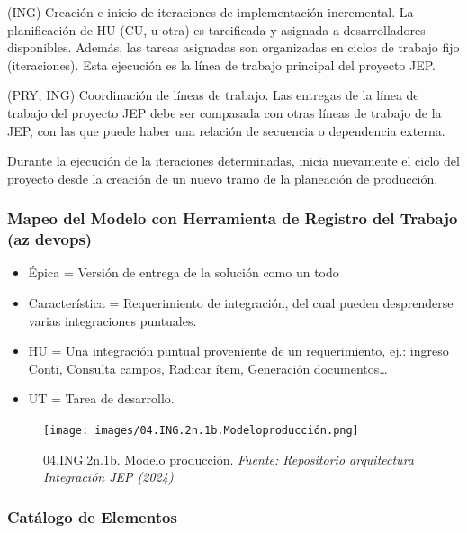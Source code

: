 \documentclass[
  paper=a4,
  ,captions=tableheading
]{scrartcl}
\providecommand{\tightlist}{%
  \setlength{\itemsep}{0pt}\setlength{\parskip}{0pt}}
\begin{document}
(ING) Creación e inicio de iteraciones de implementación incremental. La
planificación de HU (CU, u otra) es tareificada y asignada a
desarrolladores disponibles. Además, las tareas asignadas son
organizadas en ciclos de trabajo fijo (iteraciones). Esta ejecución es
la línea de trabajo principal del proyecto JEP.

(PRY, ING) Coordinación de líneas de trabajo. Las entregas de la línea
de trabajo del proyecto JEP debe ser compasada con otras líneas de
trabajo de la JEP, con las que puede haber una relación de secuencia o
dependencia externa.

Durante la ejecución de la iteraciones determinadas, inicia nuevamente
el ciclo del proyecto desde la creación de un nuevo tramo de la
planeación de producción.

\subsubsection{Mapeo del Modelo con Herramienta de Registro del Trabajo
(az
devops)}\label{sec:mapeo-del-modelo-con-herramienta-de-registro-del-trabajo-az-devops}

\begin{itemize}
\tightlist
\item
  Épica = Versión de entrega de la solución como un todo
\item
  Característica = Requerimiento de integración, del cual pueden
  desprenderse varias integraciones puntuales.
\item
  HU = Una integración puntual proveniente de un requerimiento, ej.:
  ingreso Conti, Consulta campos, Radicar ítem, Generación
  documentos\ldots{}
\item
  UT = Tarea de desarrollo.
\end{itemize}

\begin{figure}
\centering
\texttt{[image: images/04.ING.2n.1b.Modeloproducción.png]}
\caption{04.ING.2n.1b. Modelo producción. \emph{Fuente: Repositorio
arquitectura Integración JEP
(2024)}}\label{fig:id-9938d5859d53450fa5c5c953d9ce33cb}
\end{figure}

\subsubsection{Catálogo de
Elementos}\label{sec:catuxe1logo-de-elementos-2}
\end{document}
